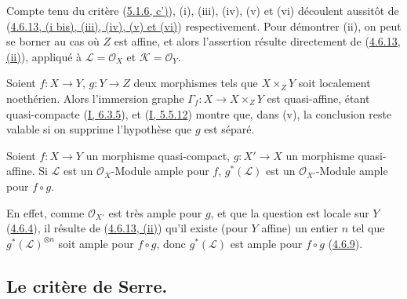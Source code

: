 Compte tenu du critère (\hyperref[II.5.1.6-fr]{5.1.6, c')}), (i), (iii),
(iv), (v) et (vi) découlent aussitôt de
(\hyperref[II.4.6.13-fr]{4.6.13, (i bis), (iii), (iv), (v) et (vi)})
respectivement. Pour démontrer (ii), on peut se borner au cas où $Z$ est
affine, et alors l'assertion résulte directement de
(\hyperref[II.4.6.13-fr]{4.6.13, (ii)}), appliqué à
$\mathcal{L}=\mathcal{O}_X$ et $\mathcal{K}=\mathcal{O}_Y$.

\begin{remark}[5.1.11]
\label{II.5.1.11-fr}
Soient $f:X\to Y$, $g:Y\to Z$ deux morphismes tels que $X\times_ZY$ soit
localement noethérien. Alors l'immersion graphe
$\Gamma_f:X\to X\times_ZY$ est quasi-affine, étant quasi-compacte
(\hyperref[I.6.3.5-fr]{I, 6.3.5}), et
(\hyperref[I.5.5.12-fr]{I, 5.5.12}) montre que, dans (v), la conclusion reste
valable si on supprime l'hypothèse que $g$ est séparé.
\end{remark}

\begin{proposition}[5.1.12]
\label{II.5.1.12-fr}
Soient $f:X\to Y$ un morphisme quasi-compact, $g:X'\to X$ un morphisme
quasi-affine. Si $\mathcal{L}$ est un $\mathcal{O}_X$-Module ample pour
$f$, $g^*(\mathcal{L})$ est un $\mathcal{O}_{X'}$-Module ample pour
$f\circ g$.
\end{proposition}

En effet, comme $\mathcal{O}_{X'}$ est très ample pour $g$, et que la
question est locale sur $Y$ (\hyperref[II.4.6.4-fr]{4.6.4}), il résulte de
(\hyperref[II.4.6.13-fr]{4.6.13, (ii)}) qu'il existe (pour $Y$ affine) un
entier $n$ tel que $g^*(\mathcal{L})^{\otimes n}$ soit ample pour
$f\circ g$, donc $g^*(\mathcal{L})$ est ample pour $f\circ g$
(\hyperref[II.4.6.9-fr]{4.6.9}).


\subsection{Le critère de Serre.}
\label{subsection:II.5.2-fr}

